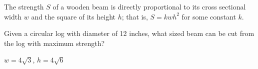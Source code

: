 {The strength $S$ of a wooden beam is directly proportional to its cross sectional  width $w$ and the square of its height $h$; that is, $S = kwh^2$ for some constant $k$. 

\noindent\begin{minipage}{\linewidth}
\centering
{}
\end{minipage}

Given a circular log with diameter of 12 inches, what sized beam can be cut from the log with maximum strength?
}
{$w=4\sqrt{3}$, $h=4\sqrt{6}$
}

